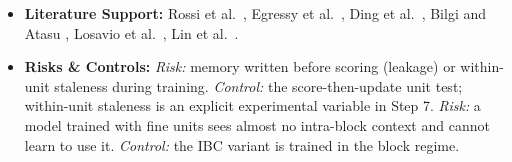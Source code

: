 \documentclass[11pt,a4paper]{article}
\begin{document}
\begin{itemize}[leftmargin=*]
    \item \textbf{Literature Support:} Rossi et al.\ \cite{rossi2020tgn}, Egressy et al.\ \cite{egressy2024multigraph}, Ding et al.\ \cite{ding2024diam}, Bilgi and Atasu \cite{bilgi2026mega}, Losavio et al.\ \cite{losavio2026saltgnn}, Lin et al.\ \cite{lin2017focal}.
    \item \textbf{Risks \& Controls:} \textit{Risk:} memory written before scoring (leakage) or within-unit staleness during training. \textit{Control:} the score-then-update unit test; within-unit staleness is an explicit experimental variable in Step 7. \textit{Risk:} a model trained with fine units sees almost no intra-block context and cannot learn to use it. \textit{Control:} the IBC variant is trained in the block regime.
\end{itemize}

\end{document}
